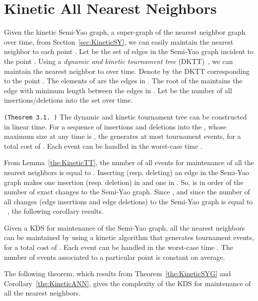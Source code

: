 \documentclass[11pt]{llncs}
\begin{document}
\section{Kinetic All Nearest Neighbors}\label{sec:KineticANN}
Given the kinetic Semi-Yao graph, a super-graph of the nearest neighbor graph over time, from Section~\ref{sec:KineticSY}, we can easily maintain the nearest neighbor to each point . Let  be the set of edges in the Semi-Yao graph incident to the point .  Using a \textit{dynamic and kinetic tournament tree} (DKTT)~\cite{Agarwal:2008:KDD:1435375.1435379,Basch:1997:DSM:314161.314435}, we can maintain the nearest neighbor to  over time. Denote by  the DKTT corresponding to the point . The elements of  are the edges in . The root of the  maintains the edge with minimum length between the edges in . Let  be the number of all insertions/deletions into the set  over time. \begin{lemma}\label{the:KineticTT} {\tt (Theorem 3.1.~\cite{Agarwal:2008:KDD:1435375.1435379})}
The dynamic and kinetic tournament tree  can be constructed in linear time. For a sequence of  insertions and deletions into the , whose maximum size  at any time is , the  generates at most  tournament events, for a total cost of . Each event can be handled in the worst-case time .
\end{lemma}
From Lemma~\ref{the:KineticTT}, the number of all events for maintenance of all the nearest neighbors is equal to . Inserting (resp. deleting) an edge  in the Semi-Yao graph makes one insertion (resp. deletion) in  and one in . So,  is in order of the number of exact changes to the Semi-Yao graph. Since , and since the number of all changes (edge insertions and edge deletions) to the Semi-Yao graph is equal to ~\cite{socg17-rahmati}, the following corollary results.
\begin{corollary}\label{the:KineticANN}
Given a KDS for  maintenance of the Semi-Yao graph, all the nearest neighbors can be maintained by using a kinetic algorithm that generates  tournament events, for a total cost of . Each event can be handled in the worst-case time . The number of events associated to a particular point is constant on average.
\end{corollary}
The following theorem, which results from Theorem~\ref{the:KineticSYG} and Corollary~\ref{the:KineticANN}, gives the complexity of the KDS for maintenance of all the nearest neighbors.
\end{document}
